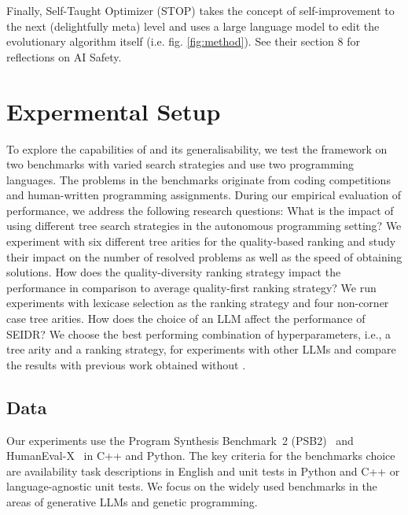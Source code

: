 Finally, Self-Taught Optimizer (STOP) \cite{zelikmanSelfTaughtOptimizerSTOP2023} takes the concept of self-improvement to the next (delightfully meta) level and uses a large language model to edit the evolutionary algorithm itself (i.e. fig. \ref{fig:method}). See their section 8 for reflections on AI Safety.

\newpage \section{Expermental Setup}
\label{sec:eval}

To explore the capabilities of \method{} and its generalisability, we test the framework on two benchmarks  with varied search strategies and use two programming languages. 
The problems in the benchmarks originate from coding competitions and human-written programming assignments. 
During our empirical evaluation of \method{} performance, we address the following research questions:
What is the impact of using different tree search strategies
in the autonomous programming setting? 
We experiment with six different tree arities for the quality-based ranking and study their impact on the number of resolved problems as well as the speed of obtaining solutions.
How does the quality-diversity ranking strategy impact the performance in comparison to average quality-first ranking strategy? 
We run experiments with lexicase selection as the ranking strategy and four non-corner case tree arities.
How does the choice of an LLM affect the performance of SEIDR? 
We choose the best performing combination of hyperparameters, i.e., a tree arity and a ranking strategy, for experiments with other LLMs and compare the results with previous work obtained without \method{}. 


\newpage \subsection{Data}
\label{sec:data}

Our experiments use the Program Synthesis Benchmark~2 (PSB2)~\cite{helmuth2022:applying} and HumanEval-X~\cite{zheng2023:codegeex} in C++ and Python. 
The key criteria for the benchmarks choice are availability task descriptions in English and unit tests in Python and C++ or language-agnostic unit tests. 
We focus on the widely used benchmarks in the areas of generative LLMs and genetic programming. 

